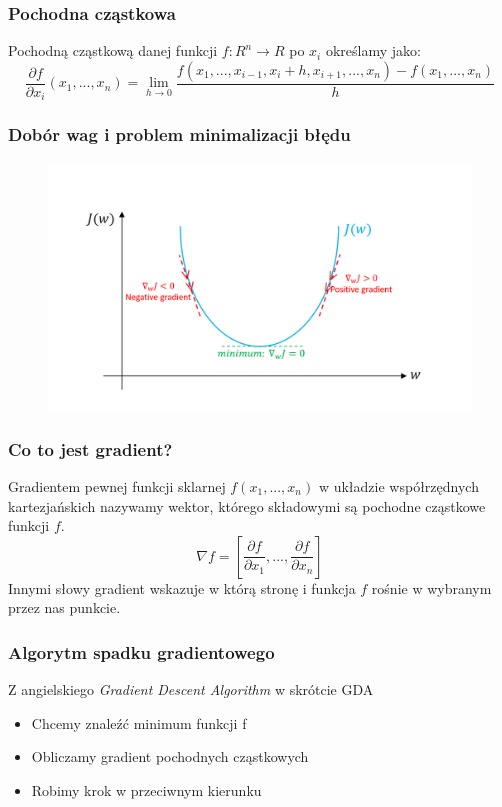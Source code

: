 \documentclass[16pt]{beamer}
\begin{document}
\begin{frame}
\frametitle{Pochodna cząstkowa}
Pochodną cząstkową danej funkcji $f:R^n \to R$ po $x_i$ określamy jako:
\[
\frac{\partial f}{\partial x_i} \left(x_1, ..., x_n\right) = \lim\limits_{h \to 0} \frac{f(x_1, ..., x_{i-1}, x_i + h, x_{i+1}, ..., x_n) - f(x_1, ..., x_n)}{h}
\]
\end{frame}

\begin{frame}
\frametitle{Dobór wag i problem minimalizacji błędu}
\begin{figure}[ht]
\includegraphics[scale=0.25]{./gradient.png}
\end{figure}
\end{frame}

\begin{frame}
\frametitle{Co to jest gradient?}
Gradientem pewnej funkcji sklarnej $f(x_1, ..., x_n)$ w układzie współrzędnych kartezjańskich nazywamy wektor, którego składowymi są pochodne cząstkowe funkcji $f$.
\[
	\nabla f = \left[\frac{\partial f}{\partial x_1}, ..., \frac{\partial f}{\partial x_n} \right]
\]
Innymi słowy gradient wskazuje w którą stronę i funkcja $f$ rośnie w wybranym przez nas punkcie.
\end{frame}


\begin{frame}
\frametitle{Algorytm spadku gradientowego}
Z angielskiego \textit{Gradient Descent Algorithm} w skrótcie GDA
\begin{itemize}
	\item Chcemy znaleźć minimum funkcji f
	\item Obliczamy gradient pochodnych cząstkowych
	\item Robimy krok w przeciwnym kierunku
\end{itemize}
\end{frame}
\end{document}
